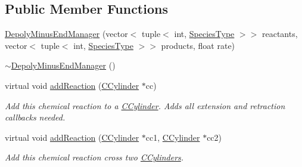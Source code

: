 \subsection*{Public Member Functions}
\begin{DoxyCompactItemize}
\item 
\hyperlink{classDepolyMinusEndManager_a73320a4e7bcb4512db8b31ca594a6a03}{Depoly\+Minus\+End\+Manager} (vector$<$ tuple$<$ int, \hyperlink{Species_8h_a50651af47c56ea0e27235468d23542cf}{Species\+Type} $>$$>$ reactants, vector$<$ tuple$<$ int, \hyperlink{Species_8h_a50651af47c56ea0e27235468d23542cf}{Species\+Type} $>$$>$ products, float rate)
\item 
\hyperlink{classDepolyMinusEndManager_a5835c7a87de23b29f47b36038fb3590b}{$\sim$\+Depoly\+Minus\+End\+Manager} ()
\item 
virtual void \hyperlink{classDepolyMinusEndManager_a6b79b7cd146bff0803044e063a9c6ef9}{add\+Reaction} (\hyperlink{classCCylinder}{C\+Cylinder} $\ast$cc)
\begin{DoxyCompactList}\small\item\em Add this chemical reaction to a \hyperlink{classCCylinder}{C\+Cylinder}. Adds all extension and retraction callbacks needed. \end{DoxyCompactList}\item 
virtual void \hyperlink{classDepolyMinusEndManager_a9ad21dd3ddb33af4e371dbdaae2d1295}{add\+Reaction} (\hyperlink{classCCylinder}{C\+Cylinder} $\ast$cc1, \hyperlink{classCCylinder}{C\+Cylinder} $\ast$cc2)
\begin{DoxyCompactList}\small\item\em Add this chemical reaction cross two \hyperlink{classCCylinder}{C\+Cylinders}. \end{DoxyCompactList}\end{DoxyCompactItemize}
